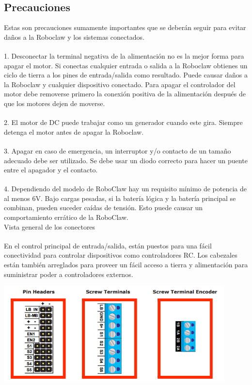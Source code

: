 \documentclass[user_manual.tex]{subfiles}
\begin{document}
\subsection{Precauciones}
Estas son precauciones sumamente importantes que se deberán seguir para evitar daños a la Roboclaw y los sistemas conectados.\\
\\
1. Desconectar la terminal negativa de la alimentación no es la mejor forma para apagar el motor. Si conectas cualquier entrada o salida
a la Roboclaw obtienes un ciclo de tierra a los pines de entrada/salida como resultado. Puede causar daños a la Roboclaw y cualquier
dispositivo conectado. Para apagar el controlador del motor debe removerse primero la conexión positiva de la alimentación después de
que los motores dejen de moverse.\\
\\
2. El motor de DC puede trabajar como un generador cuando este gira. Siempre detenga el motor
antes de apagar la Roboclaw.\\
\\
3. Apagar en caso de emergencia, un interruptor y/o contacto de un tamaño adecuado debe ser utilizado. Se debe usar un diodo correcto para
hacer un puente entre el apagador y el contacto.\\
\\
4. Dependiendo del modelo de RoboClaw hay un requisito mínimo de potencia de al menos 6V. Bajo cargas pesadas, si la batería lógica y
la batería principal se combinan, pueden suceder caídas de tensión. Esto puede causar un comportamiento errático de la RoboClaw.\\
Vista general de los conectores\\
\\
En el control principal de entrada/salida, están puestos para una fácil conectividad para controlar dispositivos como controladores RC.
Los cabezales están también arreglados para proveer un fácil acceso a tierra  y alimentación para suministrar poder a controladores externos.

\begin{center}
\includegraphics[width=0.9\textwidth]{Figures/Hardware/Partes/Pines.png}
\label{fig:Hardware:Partes:Pines}
\end{center}
\end{document}
